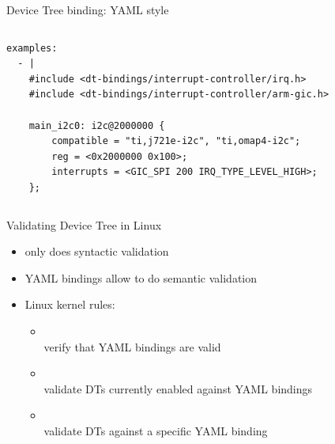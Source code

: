 \begin{frame}[fragile]{Device Tree binding: YAML style}
\begin{columns}[t]
\begin{block}{}
{\begin{verbatim}
examples:
  - |
    #include <dt-bindings/interrupt-controller/irq.h>
    #include <dt-bindings/interrupt-controller/arm-gic.h>

    main_i2c0: i2c@2000000 {
        compatible = "ti,j721e-i2c", "ti,omap4-i2c";
        reg = <0x2000000 0x100>;
        interrupts = <GIC_SPI 200 IRQ_TYPE_LEVEL_HIGH>;
    };
\end{verbatim}
      }
    \end{block}
  \end{columns}
\end{frame}

\begin{frame}{Validating Device Tree in Linux}
  \begin{itemize}
  \item {} only does syntactic validation
  \item YAML bindings allow to do semantic validation
  \item Linux kernel  rules:
    \begin{itemize}
    \item {}\\
      verify that YAML bindings are valid
    \item {}\\
      validate DTs currently enabled against YAML bindings
    \item {}\\
      validate DTs against a specific YAML binding
    \end{itemize}
  \end{itemize}
\end{frame}

